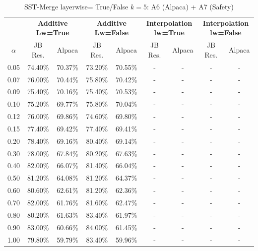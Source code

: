 
\begin{table}[h]
\centering
\caption{SST-Merge layerwise= True/False $k=5$: A6 (Alpaca) + A7 (Safety)}
\label{tab:res_a6_sst_merge_5}
\begin{tabular}{c|cc|cc|cc|cc}
\hline
 & \multicolumn{2}{c|}{\textbf{Additive Lw=True}} & \multicolumn{2}{c|}{\textbf{Additive Lw=False}} & \multicolumn{2}{c|}{\textbf{Interpolation lw=True}}& \multicolumn{2}{c}{\textbf{Interpolation lw=False}} \\
$\alpha$ & JB Res. & Alpaca & JB Res. & Alpaca & JB Res. & Alpaca & JB Res. & Alpaca \\
\hline
0.05 & 74.40\% & 70.37\% & 73.20\% & 70.55\% & - & - & - & - \\
0.07 & 76.00\% & 70.44\% & 75.80\% & 70.42\% & - & - & - & - \\
0.09 & 75.40\% & 70.16\% & 75.40\% & 70.53\% & - & - & - & - \\
0.10 & 75.20\% & 69.77\% & 75.80\% & 70.04\% & - & - & - & - \\
0.12 & 76.00\% & 69.86\% & 74.60\% & 69.80\% & - & - & - & - \\
0.15 & 77.40\% & 69.42\% & 77.40\% & 69.41\% & - & - & - & - \\
0.20 & 78.40\% & 69.16\% & 80.40\% & 69.14\% & - & - & - & - \\
0.30 & 78.00\% & 67.84\% & 80.20\% & 67.63\% & - & - & - & - \\
0.40 & 82.00\% & 66.07\% & 81.40\% & 66.04\% & - & - & - & - \\
0.50 & 81.20\% & 64.08\% & 81.20\% & 64.37\% & - & - & - & - \\
0.60 & 80.60\% & 62.61\% & 81.20\% & 62.36\% & - & - & - & - \\
0.70 & 82.00\% & 61.76\% & 81.60\% & 62.47\% & - & - & - & - \\
0.80 & 80.20\% & 61.63\% & 83.40\% & 61.97\% & - & - & - & - \\
0.90 & 83.00\% & 60.66\% & 84.00\% & 61.45\% & - & - & - & - \\
1.00 & 79.80\% & 59.79\% & 83.40\% & 59.96\% & - & - & - & - \\
\hline
\end{tabular}
\end{table}
\FloatBarrier

